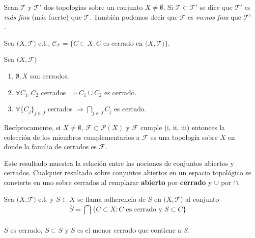 \begin{defn}
  Sean $\mathcal{T}$ y $\mathcal{T'}$ dos topologías sobre un conjunto $X \neq \emptyset$. Si $\mathcal{T} \subset \mathcal{T'}$ se dice que $\mathcal{T'}$ es \textit{ más fina } (más fuerte) que $\mathcal{T}$. También podemos decir que $\mathcal{T}$ es \textit{menos fina} que $\mathcal{T'}$.
\end{defn}

\begin{nota}
  Sea $\big( X, \mathcal{T} \big)$ e.t., $\mathcal{C}_{\mathcal{T}} = \{ C \subset X : C \text{ es cerrado en } \big( X, \mathcal{T} \big) \}$.
\end{nota}

\begin{prop}
  Sea $\big( X, \mathcal{F} \big)$
  \begin{enumerate}[label=(\roman*)]
    \item $\emptyset, X$ son cerrados.
    \item $\forall C_{1},C_{2}$ cerrados $ \Rightarrow C_{1} \cup C_{2}$ es cerrado.
    \item $\forall \{ C_{j} \}_{j \in J}$ cerrados $\Rightarrow \bigcap_{j \in J}^{} C_{j}$ es cerrado.
  \end{enumerate}
  
  Recíprocamente, si $X \neq \emptyset$, $\mathcal{F} \subset \mathcal{P}(X)$ y $\mathcal{F}$ cumple (i, ii, iii) entonces la colección de los miembros complementarios a $\mathcal{F}$ es una topología sobre $X$ en donde la familia de cerrados es $\mathcal{F}$.
\end{prop}

\begin{obs}
  Este resultado muestra la relación entre las nociones de conjuntos abiertos y cerrados. Cualquier resultado sobre conjuntos abiertos en un espacio topológico se convierte en uno sobre cerrados al remplazar \textbf{abierto} por \textbf{cerrado} y $\cup$ por $\cap$.
\end{obs}

\begin{defn}[Adherencia]
  Sea $\big( X, \mathcal{T} \big)$ e.t. y $S \subset X$ se llama adherencia de $S$ en $\big( X, \mathcal{T} \big)$ al conjunto \[ \overline{S} = \bigcap_{}^{} \{ C \subset X : C \text{ es cerrado y } S \subset C \} \] 
\end{defn}

\begin{obs}
  $\overline{S}$ es cerrado, $S \subset \overline{S}$ y $\overline{S}$ es el menor cerrado que contiene a $S$.
\end{obs}

